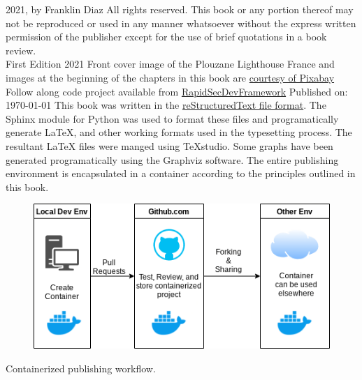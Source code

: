 \justify
\textcopyright{} 2021, by Franklin Diaz
\justify
All rights reserved. This book or any portion thereof
may not be reproduced or used in any manner whatsoever
without the express written permission of the publisher
except for the use of brief quotations in a book review.
\vspace{5mm}\\
First Edition 2021
\justify
Front cover image of the Plouzane Lighthouse France and images at the beginning of the chapters in this book are  \href{https://pixabay.com/service/terms/#license}{courtesy of Pixabay}
\justify
Follow along code project available from {\href{https://github.com/hotpeppersec/rapid_secdev_framework}{RapidSecDevFramework}}
\vspace{3mm}
Published on: \today
\justify
This book was written in the {\href{https://en.wikipedia.org/wiki/ReStructuredTex}{reStructuredText file format}}. The Sphinx module for Python was used to format these files and programatically generate LaTeX, and other working formats used in the typesetting process. The resultant LaTeX files were manged using TeXstudio. Some graphs have been generated programatically using the Graphviz software. The entire publishing environment is encapsulated in a container according to the principles outlined in this book.

\vspace{5mm}
    \centering
\vspace{0mm}
\begin{figure}[!h]
	\centering
	\includegraphics[scale=0.75]{../images/workflow.png}
\end{figure}
\vspace{2mm}
Containerized publishing workflow.
